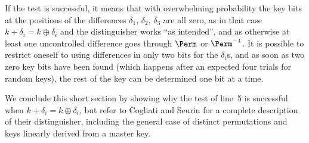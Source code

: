If the test is successful, it means that with overwhelming probability
the key bits at the positions of the differences $\delta_1$, $\delta_2$,
$\delta_3$ are all zero, as in that case  $k + \delta_i = k \oplus \delta_i$ and
the distinguisher works ``as intended'', and as otherwise at least one uncontrolled difference goes through $\Perm$ or $\Perm^{-1}$.
It is possible to restrict oneself to using differences in only two bits for the $\delta_i$s, and as soon as two zero key bits
have been found (which happens after an expected four trials for
random keys), the rest of the key can be determined one bit at a time.

We conclude this short section by showing why the test of line~5 is successful when $k + \delta_i = k \oplus \delta_i$,
but refer to Cogliati and Seurin for a complete description of their distinguisher, including the general case of distinct
permutations and keys linearly derived from a master key.

